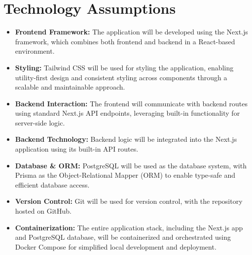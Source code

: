 \documentclass[a4paper,11pt]{article}
\begin{document}




\section{Technology Assumptions}
\begin{itemize}
    \item \textbf{Frontend Framework:} The application will be developed using the Next.js framework, which combines both frontend and backend in a React-based environment.
    \item \textbf{Styling:} Tailwind CSS will be used for styling the application, enabling utility-first design and consistent styling across components through a scalable and maintainable approach.
    \item \textbf{Backend Interaction:} The frontend will communicate with backend routes using standard Next.js API endpoints, leveraging built-in functionality for server-side logic.
    \item \textbf{Backend Technology:} Backend logic will be integrated into the Next.js application using its built-in API routes.
    \item \textbf{Database \& ORM:} PostgreSQL will be used as the database system, with Prisma as the Object-Relational Mapper (ORM) to enable type-safe and efficient database access.
    \item \textbf{Version Control:} Git will be used for version control, with the repository hosted on GitHub.
    \item \textbf{Containerization:} The entire application stack, including the Next.js app and PostgreSQL database, will be containerized and orchestrated using Docker Compose for simplified local development and deployment.
\end{itemize}
\end{document}
